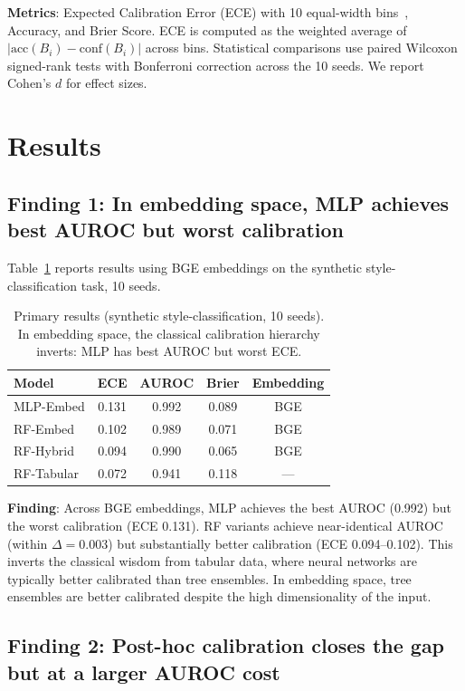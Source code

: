 \documentclass[11pt]{article}
\begin{document}
\textbf{Metrics}: Expected Calibration Error (ECE) with 10 equal-width bins~\cite{guo2017calibration}, Accuracy, and Brier Score. ECE is computed as the weighted average of $|\text{acc}(B_i) - \text{conf}(B_i)|$ across bins. Statistical comparisons use paired Wilcoxon signed-rank tests with Bonferroni correction across the 10 seeds. We report Cohen's $d$ for effect sizes.

\section{Results}

\subsection{Finding 1: In embedding space, MLP achieves best AUROC but worst calibration}

Table~\ref{tab:main} reports results using BGE embeddings on the synthetic style-classification task, 10 seeds.

\begin{table}[H]
\centering
\caption{Primary results (synthetic style-classification, 10 seeds). In embedding space, the classical calibration hierarchy inverts: MLP has best AUROC but worst ECE.}
\label{tab:main}
\footnotesize
\begin{tabular}{@{}lcccc@{}}
\toprule
\textbf{Model} & \textbf{ECE} & \textbf{AUROC} & \textbf{Brier} & \textbf{Embedding} \\
\midrule
MLP-Embed       & 0.131 & 0.992 & 0.089 & BGE \\
RF-Embed        & 0.102 & 0.989 & 0.071 & BGE \\
RF-Hybrid       & 0.094 & 0.990 & 0.065 & BGE \\
\midrule
RF-Tabular      & 0.072 & 0.941 & 0.118 & --- \\
\bottomrule
\end{tabular}
\end{table}

\textbf{Finding}: Across BGE embeddings, MLP achieves the best AUROC (0.992) but the worst calibration (ECE 0.131). RF variants achieve near-identical AUROC (within $\Delta{=}0.003$) but substantially better calibration (ECE 0.094--0.102). This inverts the classical wisdom from tabular data, where neural networks are typically better calibrated than tree ensembles. In embedding space, tree ensembles are better calibrated despite the high dimensionality of the input.

\subsection{Finding 2: Post-hoc calibration closes the gap but at a larger AUROC cost}
\end{document}
